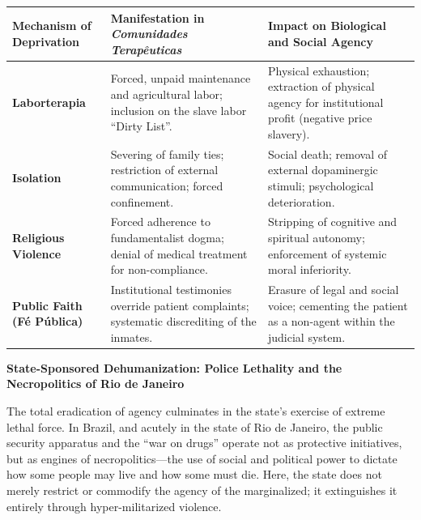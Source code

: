 {\def\LTcaptype{none} %
\begin{longtable}[]{@{}
  >{\raggedright\arraybackslash}p{}
  >{\raggedright\arraybackslash}p{}
  >{\raggedright\arraybackslash}p{}@{}}
\toprule\noalign{}
\begin{minipage}[b]{\linewidth}\raggedright
Mechanism of Deprivation
\end{minipage} & \begin{minipage}[b]{\linewidth}\raggedright
Manifestation in \emph{Comunidades Terapêuticas}
\end{minipage} & \begin{minipage}[b]{\linewidth}\raggedright
Impact on Biological and Social Agency
\end{minipage} \\
\midrule\noalign{}
\endhead
\bottomrule\noalign{}
\endlastfoot
\textbf{Laborterapia} & Forced, unpaid maintenance and agricultural labor; inclusion on the slave labor ``Dirty List''. & Physical exhaustion; extraction of physical agency for institutional profit (negative price slavery). \\
\textbf{Isolation} & Severing of family ties; restriction of external communication; forced confinement. & Social death; removal of external dopaminergic stimuli; psychological deterioration. \\
\textbf{Religious Violence} & Forced adherence to fundamentalist dogma; denial of medical treatment for non-compliance. & Stripping of cognitive and spiritual autonomy; enforcement of systemic moral inferiority. \\
\textbf{Public Faith (Fé Pública)} & Institutional testimonies override patient complaints; systematic discrediting of the inmates. & Erasure of legal and social voice; cementing the patient as a non-agent within the judicial system. \\
\end{longtable}
}

\textbf{State-Sponsored Dehumanization: Police Lethality and the Necropolitics of Rio de Janeiro}

The total eradication of agency culminates in the state's exercise of extreme lethal force. In Brazil, and acutely in the state of Rio de Janeiro, the public security apparatus and the ``war on drugs'' operate not as protective initiatives, but as engines of necropolitics---the use of social and political power to dictate how some people may live and how some must die. Here, the state does not merely restrict or commodify the agency of the marginalized; it extinguishes it entirely through hyper-militarized violence.

